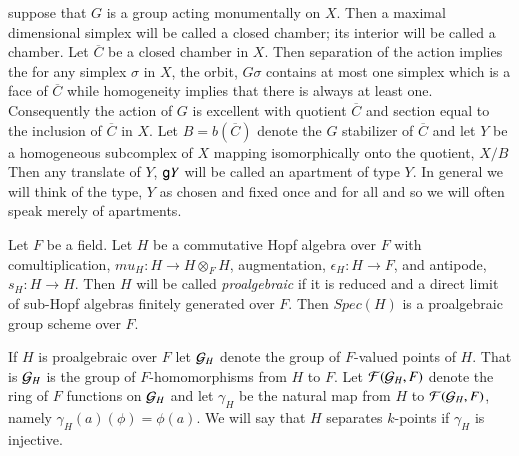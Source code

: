 suppose that $G$ is a group acting monumentally on $X$. Then a maximal dimensional simplex will be called a closed chamber; its interior will be called a chamber. Let $\overline{C}$ be a closed chamber in $X$. Then separation of the action implies the for any simplex $\sigma$ in $X$, the orbit, $G\sigma$ contains at most one simplex which is a face of $\overline{C}$ while homogeneity implies that there is always at least one. Consequently the action of $G$ is excellent with quotient $\overline{C}$ and section equal to the inclusion of $\overline{C}$ in $X$. Let $B = b(\overline{C})$ denote the $G$ stabilizer of $\overline{C}$ and let $Y$ be a homogeneous subcomplex of $X$ mapping isomorphically onto the quotient, $X/B$ Then any translate of $Y$, $\mathsf{g} Y$ will be called an apartment of type $Y$. In general we will think of the type, $Y$ as chosen and fixed once and for all and so we will often speak merely of apartments.  

Let $F$ be a field. Let $H$ be a commutative Hopf algebra over $F$ with comultiplication, $mu_{H} : H \rightarrow H \otimes_{F} H$, augmentation, $\epsilon_{H} : H \rightarrow F$, and antipode, $s_{H} : H \rightarrow H$. Then $H$ will be called \textit{proalgebraic} if it is reduced and a direct limit of sub-Hopf algebras finitely generated over $F$. Then $Spec(H)$ is a proalgebraic group scheme over $F$.

If $H$ is proalgebraic over $F$ let $\mathcal{G}_{H}$ denote the group of $F$-valued points of $H$. That is $\mathcal{G}_{H}$ is the group of $F$-homomorphisms from $H$ to $F$. Let $\mathcal{F}(\mathcal{G}_{H}, F)$ denote the ring of $F$ functions on $\mathcal{G}_{H}$ and let $\gamma_{H}$ be the natural map from $H$ to $\mathcal{F}(\mathcal{G}_{H}, F)$, namely $\gamma_{H}(a)(\phi) = \phi(a)$. We will say that $H$ separates $k$-points if $\gamma_{H}$ is injective.


